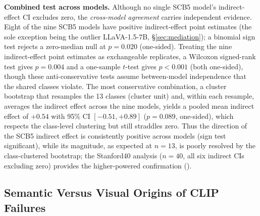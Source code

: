 \documentclass[a4paper,fleqn]{cas-sc}
\begin{document}
\textbf{Combined test across models.}
Although no single SCB5 model's indirect-effect CI excludes zero, the \emph{cross-model agreement} carries independent evidence. Eight of the nine SCB5 models have positive indirect-effect point estimates (the sole exception being the outlier LLaVA-1.5-7B, \S\ref{sec:mediation}); a binomial sign test rejects a zero-median null at $p=0.020$ (one-sided). Treating the nine indirect-effect point estimates as exchangeable replicates, a Wilcoxon signed-rank test gives $p=0.004$ and a one-sample $t$-test gives $p<0.001$ (both one-sided), though these anti-conservative tests assume between-model independence that the shared classes violate. The most conservative combination, a cluster bootstrap that resamples the 13 classes (cluster unit) and, within each resample, averages the indirect effect across the nine models, yields a pooled mean indirect effect of $+0.54$ with 95\% CI $[-0.51, +0.89]$ ($p=0.089$, one-sided), which respects the class-level clustering but still straddles zero. Thus the direction of the SCB5 indirect effect is consistently positive across models (sign test significant), while its magnitude, as expected at $n=13$, is poorly resolved by the class-clustered bootstrap; the Stanford40 analysis ($n=40$, all six indirect CIs excluding zero) provides the higher-powered confirmation ().

\subsection{Semantic Versus Visual Origins of CLIP Failures}
\label{sec:prompt}
\end{document}
